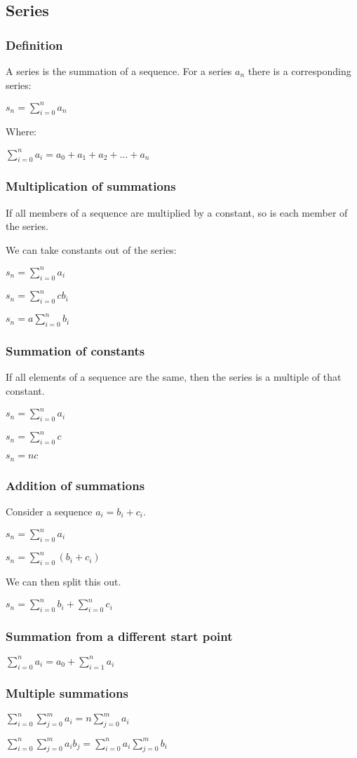 
\subsection{Series}

\subsubsection{Definition}

A series is the summation of a sequence. For a series \(a_n\) there is a corresponding series:

\(s_n=\sum_{i=0}^na_n\)

Where:

\(\sum_{i=0}^na_i=a_0+a_1+a_2+...+a_n\)

\subsubsection{Multiplication of summations}

If all members of a sequence are multiplied by a constant, so is each member of the series.

We can take constants out of the series:

\(s_n=\sum_{i=0}^na_i\)

\(s_n=\sum_{i=0}^ncb_i\)

\(s_n=a\sum_{i=0}^nb_i\)

\subsubsection{Summation of constants}

If all elements of a sequence are the same, then the series is a multiple of that constant.

\(s_n=\sum_{i=0}^na_i\)

\(s_n=\sum_{i=0}^nc\)

\(s_n=nc\)

\subsubsection{Addition of summations}

Consider a sequence \(a_i=b_i+c_i\).

\(s_n=\sum_{i=0}^na_i\)

\(s_n=\sum_{i=0}^n(b_i+c_i)\)

We can then split this out.

\(s_n=\sum_{i=0}^nb_i+\sum_{i=0}^nc_i\)

\subsubsection{Summation from a different start point}

\(\sum_{i=0}^na_i=a_0+\sum_{i=1}^na_i\)

\subsubsection{Multiple summations}

\(\sum^n_{i=0} \sum^m_{j=0} a_i=n\sum^m_{j=0} a_i\)

\(\sum^n_{i=0} \sum^m_{j=0} a_i b_j=\sum^n_{i=0}a_i\sum^m_{j=0}b_i\)

